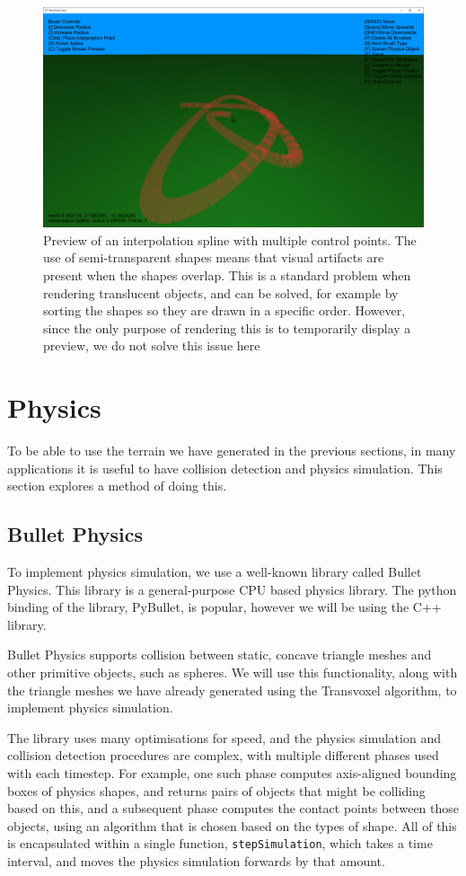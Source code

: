 \documentclass{article}
\begin{document}
\begin{figure}[H]
  \includegraphics[width=\textwidth]{spline_preview.png}
  \caption{Preview of an interpolation spline with multiple control points. The use of semi-transparent shapes means that visual artifacts are present when the shapes overlap. This is a standard problem when rendering translucent objects, and can be solved, for example by sorting the shapes so they are drawn in a specific order. However, since the only purpose of rendering this is to temporarily display a preview, we do not solve this issue here}
  \label{fig:spline_preview}
\end{figure}
\section{Physics}
To be able to use the terrain we have generated in the previous sections, in many applications it is useful to have collision detection and physics simulation. This section explores a method of doing this.
\subsection{Bullet Physics}
To implement physics simulation, we use a well-known library called Bullet Physics\cite{bullet-physics}. This library is a general-purpose CPU based physics library. The python binding of the library, PyBullet, is popular, however we will be using the C++ library.

Bullet Physics supports collision between static, concave triangle meshes and other primitive objects, such as spheres. We will use this functionality, along with the triangle meshes we have already generated using the Transvoxel algorithm, to implement physics simulation.

The library uses many optimisations for speed, and the physics simulation and collision detection procedures are complex, with multiple different phases used with each timestep. For example, one such phase computes axis-aligned bounding boxes of physics shapes, and returns pairs of objects that might be colliding based on this, and a subsequent phase computes the contact points between those objects, using an algorithm that is chosen based on the types of shape. All of this is encapsulated within a single function, \texttt{stepSimulation}, which takes a time interval, and moves the physics simulation forwards by that amount.
\end{document}
